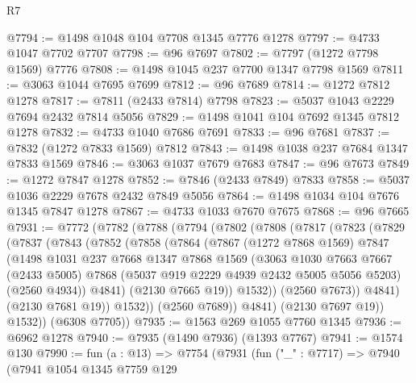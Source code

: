 \begin{lexlean}{R7}
\begin{coremodule}
@7794 := @1498 @1048 @104 @7708 @1345 @7776 @1278
@7797 := @4733 @1047 @7702 @7707
@7798 := @96 @7697
@7802 := @7797 (@1272 @7798 @1569) @7776
@7808 := @1498 @1045 @237 @7700 @1347 @7798 @1569
@7811 := @3063 @1044 @7695 @7699
@7812 := @96 @7689
@7814 := @1272 @7812 @1278
@7817 := @7811 (@2433 @7814) @7798
@7823 := @5037 @1043 @2229 @7694 @2432 @7814 @5056
@7829 := @1498 @1041 @104 @7692 @1345 @7812 @1278
@7832 := @4733 @1040 @7686 @7691
@7833 := @96 @7681
@7837 := @7832 (@1272 @7833 @1569) @7812
@7843 := @1498 @1038 @237 @7684 @1347 @7833 @1569
@7846 := @3063 @1037 @7679 @7683
@7847 := @96 @7673
@7849 := @1272 @7847 @1278
@7852 := @7846 (@2433 @7849) @7833
@7858 := @5037 @1036 @2229 @7678 @2432 @7849 @5056
@7864 := @1498 @1034 @104 @7676 @1345 @7847 @1278
@7867 := @4733 @1033 @7670 @7675
@7868 := @96 @7665
@7931 := @7772
    (@7782
      (@7788
        (@7794
          (@7802
            (@7808
              (@7817
                (@7823
                  (@7829
                    (@7837
                      (@7843
                        (@7852
                          (@7858
                            (@7864
                              (@7867
                                (@1272 @7868 @1569)
                                @7847
                                (@1498
                                  @1031
                                  @237
                                  @7668
                                  @1347
                                  @7868
                                  @1569
                                  (@3063
                                    @1030
                                    @7663
                                    @7667
                                    (@2433 @5005)
                                    @7868
                                    (@5037 @919 @2229 @4939 @2432 @5005 @5056 @5203)
                                    (@2560 @4934))
                                  @4841)
                                (@2130 @7665 @19))
                              @1532))
                          (@2560 @7673))
                        @4841)
                      (@2130 @7681 @19))
                    @1532))
                (@2560 @7689))
              @4841)
            (@2130 @7697 @19))
          @1532))
      (@6308 @7705))
@7935 := @1563 @269 @1055 @7760 @1345
@7936 := @6962 @1278
@7940 := @7935 (@1490 @7936) (@1393 @7767)
@7941 := @1574 @130
@7990 := fun (a : @13) =>
  @7754
    (@7931
      (fun ("_" : @7717) =>
      @7940
        (@7941
          @1054
          @1345
          @7759
          @129

\end{coremodule}
\end{lexlean}
